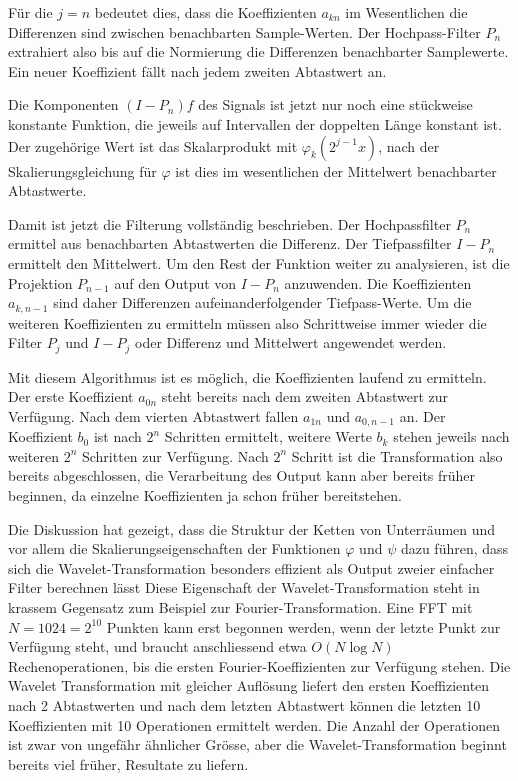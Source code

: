 Für die $j=n$ bedeutet dies, dass die Koeffizienten $a_{kn}$ im Wesentlichen
die Differenzen sind zwischen benachbarten Sample-Werten.
Der Hochpass-Filter $P_n$ extrahiert also bis auf die Normierung
die Differenzen benachbarter Samplewerte.
Ein neuer Koeffizient fällt nach jedem zweiten Abtastwert an.

Die Komponenten $(I-P_n)f$ des Signals ist jetzt nur noch eine stückweise
konstante Funktion, die jeweils auf Intervallen der doppelten Länge konstant
ist.
Der zugehörige Wert ist das Skalarprodukt mit $\varphi_k(2^{j-1}x)$, nach
der Skalierungsgleichung für $\varphi$ ist dies im wesentlichen der
Mittelwert benachbarter Abtastwerte.

Damit ist jetzt die Filterung vollständig beschrieben.
Der Hochpassfilter $P_n$ ermittel aus benachbarten Abtastwerten die
Differenz.
Der Tiefpassfilter $I-P_n$ ermittelt den Mittelwert.
Um den Rest der Funktion weiter zu analysieren, ist die Projektion $P_{n-1}$
auf den Output von $I-P_n$ anzuwenden.
Die Koeffizienten $a_{k,n-1}$ sind daher Differenzen aufeinanderfolgender
Tiefpass-Werte.
Um die weiteren Koeffizienten zu ermitteln müssen also Schrittweise
immer wieder die Filter $P_j$ und $I-P_j$ oder Differenz und Mittelwert
angewendet werden.

Mit diesem Algorithmus ist es möglich, die Koeffizienten laufend zu ermitteln.
Der erste Koeffizient $a_{0n}$ steht bereits nach dem zweiten Abtastwert zur
Verfügung.
Nach dem vierten Abtastwert fallen $a_{1n}$ und $a_{0,n-1}$ an.
Der Koeffizient $b_0$ ist nach $2^n$ Schritten ermittelt, weitere
Werte $b_k$ stehen jeweils nach weiteren $2^n$ Schritten zur Verfügung.
Nach $2^n$ Schritt ist die Transformation also bereits abgeschlossen,
die Verarbeitung des Output kann aber bereits früher beginnen, da einzelne
Koeffizienten ja schon früher bereitstehen.

Die Diskussion hat gezeigt, dass die Struktur der Ketten von Unterräumen
und vor allem die Skalierungseigenschaften der Funktionen $\varphi$ und $\psi$
dazu führen, dass sich die Wavelet-Transformation besonders effizient
als Output zweier einfacher Filter berechnen lässt
Diese Eigenschaft der Wavelet-Transformation steht in krassem Gegensatz
zum Beispiel zur Fourier-Transformation.
Eine FFT mit $N=1024=2^{10}$ Punkten kann erst begonnen werden, wenn der
letzte Punkt zur Verfügung steht, und braucht anschliessend etwa
$O(N\log N)$ Rechenoperationen, bis die ersten Fourier-Koeffizienten zur
Verfügung stehen.
Die Wavelet Transformation mit gleicher Auflösung liefert den ersten Koeffizienten nach 2 Abtastwerten und nach dem letzten Abtastwert können die letzten 10
Koeffizienten mit 10 Operationen ermittelt werden.
Die Anzahl der Operationen ist zwar von ungefähr ähnlicher Grösse, aber
die Wavelet-Transformation beginnt bereits viel früher, Resultate zu
liefern.

